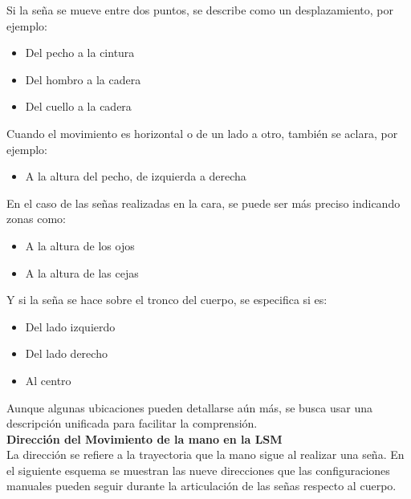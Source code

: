 Si la seña se mueve entre dos puntos, se describe como un desplazamiento, por ejemplo:

\begin{itemize}
    \item Del pecho a la cintura
    \item Del hombro a la cadera
    \item Del cuello a la cadera
\end{itemize}

Cuando el movimiento es horizontal o de un lado a otro, también se aclara, por ejemplo:
\begin{itemize}
    \item A la altura del pecho, de izquierda a derecha
\end{itemize}

En el caso de las señas realizadas en la cara, se puede ser más preciso indicando zonas como:
\begin{itemize}
    \item A la altura de los ojos
    \item A la altura de las cejas    
\end{itemize}

Y si la seña se hace sobre el tronco del cuerpo, se especifica si es:
\begin{itemize}
    \item Del lado izquierdo
    \item Del lado derecho
    \item Al centro
\end{itemize}

Aunque algunas ubicaciones pueden detallarse aún más, se busca usar una descripción unificada para facilitar la comprensión.\\

\textbf{Dirección del Movimiento de la mano en la LSM}\\
La dirección se refiere a la trayectoria que la mano sigue al realizar una seña. En el siguiente esquema se muestran las nueve direcciones que las configuraciones manuales pueden seguir durante la articulación de las señas respecto al cuerpo.

